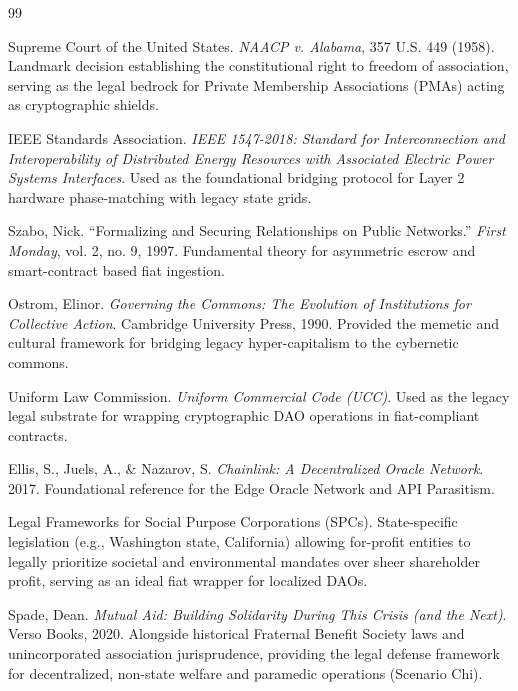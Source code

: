 \begin{thebibliography}{99}

Supreme Court of the United States. \textit{NAACP v. Alabama}, 357 U.S. 449 (1958). Landmark decision establishing the constitutional right to freedom of association, serving as the legal bedrock for Private Membership Associations (PMAs) acting as cryptographic shields.

IEEE Standards Association. \textit{IEEE 1547-2018: Standard for Interconnection and Interoperability of Distributed Energy Resources with Associated Electric Power Systems Interfaces}. Used as the foundational bridging protocol for Layer 2 hardware phase-matching with legacy state grids.

Szabo, Nick. ``Formalizing and Securing Relationships on Public Networks.'' \textit{First Monday}, vol. 2, no. 9, 1997. Fundamental theory for asymmetric escrow and smart-contract based fiat ingestion.

Ostrom, Elinor. \textit{Governing the Commons: The Evolution of Institutions for Collective Action}. Cambridge University Press, 1990. Provided the memetic and cultural framework for bridging legacy hyper-capitalism to the cybernetic commons.

Uniform Law Commission. \textit{Uniform Commercial Code (UCC)}. Used as the legacy legal substrate for wrapping cryptographic DAO operations in fiat-compliant contracts.

Ellis, S., Juels, A., \& Nazarov, S. \textit{Chainlink: A Decentralized Oracle Network}. 2017. Foundational reference for the Edge Oracle Network and API Parasitism.

Legal Frameworks for Social Purpose Corporations (SPCs). State-specific legislation (e.g., Washington state, California) allowing for-profit entities to legally prioritize societal and environmental mandates over sheer shareholder profit, serving as an ideal fiat wrapper for localized DAOs.

Spade, Dean. \textit{Mutual Aid: Building Solidarity During This Crisis (and the Next)}. Verso Books, 2020. Alongside historical Fraternal Benefit Society laws and unincorporated association jurisprudence, providing the legal defense framework for decentralized, non-state welfare and paramedic operations (Scenario Chi).

\end{thebibliography}
